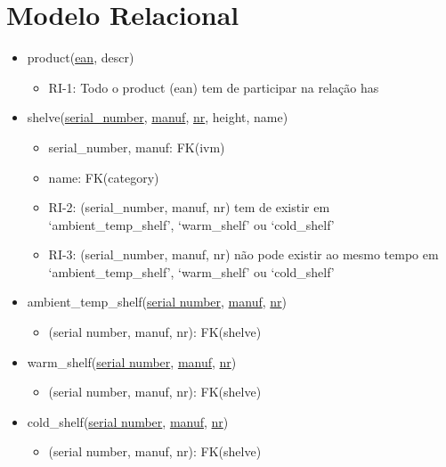 \documentclass{article}
\newcommand{\bpoint}{\item[$\bullet$]}
\newenvironment{myitemize}
{ \begin{itemize}
	\setlength{\itemsep}{5pt}
	\setlength{\parskip}{0pt}
	\setlength{\parsep}{0pt} }
{ \end{itemize}	}
\begin{document}
	\section*{Modelo Relacional}
	\vspace{2mm}
	\begin{myitemize}

		\item[] product(\underline{ean}, descr)
		\begin{myitemize}
				\bpoint RI-1: Todo o product (ean) tem de participar na relação has
		\end{myitemize}

		\vspace{2mm}

		\item[] shelve(\underline{serial\_number}, \underline{manuf}, \underline{nr}, height, name)
		\begin{myitemize}
			\bpoint serial\_number, manuf: FK(ivm)
			\bpoint name: FK(category)
			\bpoint RI-2: (serial\_number, manuf, nr) tem de existir em `ambient\_temp\_shelf', `warm\_shelf' ou `cold\_shelf'
			\bpoint RI-3: (serial\_number, manuf, nr) não pode existir ao mesmo tempo em `ambient\_temp\_shelf', `warm\_shelf' ou `cold\_shelf'
		\end{myitemize}

		\vspace{2mm}

		\item[] ambient\_temp\_shelf(\underline{serial number}, \underline{manuf}, \underline{nr})
		\begin{myitemize}
			\bpoint (serial number, manuf, nr): FK(shelve)
		\end{myitemize}

		\vspace{2mm}

		\item[] warm\_shelf(\underline{serial number}, \underline{manuf}, \underline{nr})
		\begin{myitemize}
			\bpoint (serial number, manuf, nr): FK(shelve)
		\end{myitemize}

		\vspace{2mm}

		\item[]{cold\_shelf(\underline{serial number}, \underline{manuf}, \underline{nr})}
		\begin{myitemize}
			\bpoint (serial number, manuf, nr): FK(shelve)
		\end{myitemize}


\end{myitemize}
\end{document}

